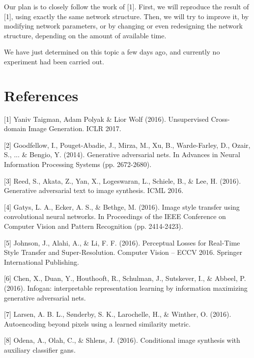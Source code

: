 \documentclass{article}
\begin{document}
Our plan is to closely follow the work of [1]. First, we will reproduce the result of [1], using exactly the same network structure. Then, we will try to improve it, by modifying network parameters, or by changing or even redesigning the network structure, depending on the amount of available time.

We have just determined on this topic a few days ago, and currently no experiment had been carried out.

\section*{References}

\medskip

\small

[1] Yaniv Taigman, Adam Polyak \& Lior Wolf (2016). Unsupervised Cross-domain Image Generation. ICLR 2017.

[2] Goodfellow, I., Pouget-Abadie, J., Mirza, M., Xu, B., Warde-Farley, D., Ozair, S., ... \& Bengio, Y. (2014). Generative adversarial nets. In Advances in Neural Information Processing Systems (pp. 2672-2680).

[3] Reed, S., Akata, Z., Yan, X., Logeswaran, L., Schiele, B., \& Lee, H. (2016). Generative adversarial text to image synthesis. ICML 2016.

[4] Gatys, L. A., Ecker, A. S., \& Bethge, M. (2016). Image style transfer using convolutional neural networks. In Proceedings of the IEEE Conference on Computer Vision and Pattern Recognition (pp. 2414-2423).

[5] Johnson, J., Alahi, A., \& Li, F. F. (2016). Perceptual Losses for Real-Time Style Transfer and Super-Resolution. Computer Vision – ECCV 2016. Springer International Publishing.

[6] Chen, X., Duan, Y., Houthooft, R., Schulman, J., Sutskever, I., \& Abbeel, P. (2016). Infogan: interpretable representation learning by information maximizing generative adversarial nets.

[7] Larsen, A. B. L., Sønderby, S. K., Larochelle, H., \& Winther, O. (2016). Autoencoding beyond pixels using a learned similarity metric.

[8] Odena, A., Olah, C., \& Shlens, J. (2016). Conditional image synthesis with auxiliary classifier gans.
\end{document}
